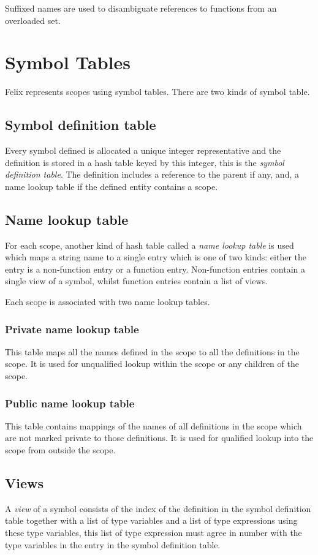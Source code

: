 \documentclass[oneside]{book}
\begin{document}
Suffixed names are used to disambiguate references to functions
from an overloaded set.

\section{Symbol Tables}
Felix represents scopes using symbol tables. There are two kinds of symbol table.

\subsection{Symbol definition table}
Every symbol defined is allocated a unique integer representative and 
the definition is stored in a hash table keyed by this integer, 
this is the {\em symbol definition table}. 
The definition includes a reference to the parent if any, and, a name lookup table if the
defined entity contains a scope.

\subsection{Name lookup table}
For each scope, another kind of hash table called a {\em name lookup table}
is used which maps a string name to a single entry which is one of two
kinds: either the entry is a non-function entry or a function entry.
Non-function entries contain a single view of a symbol, whilst 
function entries contain a list of views.

Each scope is associated with two name lookup tables.

\subsubsection{Private name lookup table}
This table maps all the names defined in the scope
to all the definitions in the scope. It is used for
unqualified lookup within the scope or any children of the scope.

\subsubsection{Public name lookup table}
This table contains mappings of the names of all
definitions in the scope which are not marked private
to those definitions. It is used for qualified lookup
into the scope from outside the scope.

\subsection{Views}
A {\em view} of a symbol consists of the index of the definition in the
symbol definition table together with a list of type variables and a list
of type expressions using these type variables, this list of
type expression must agree in number with the type variables 
in the entry in the symbol definition table.
\end{document}
